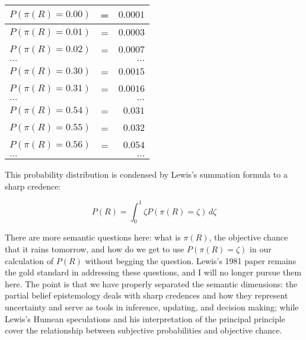\begin{tabular}{|lcr|} 
  \hline
  $P(\pi(R)=0.00)$ & = & $0.0001$ \\ \hline
  $P(\pi(R)=0.01)$ & = & $0.0003$ \\ \hline
  $P(\pi(R)=0.02)$ & = & $0.0007$ \\ \hline
  $\ldots$ & & $\ldots$ \\ \hline
  $P(\pi(R)=0.30)$ & = & $0.0015$ \\ \hline
  $P(\pi(R)=0.31)$ & = & $0.0016$ \\ \hline
  $\ldots$ & & $\ldots$ \\ \hline
  $P(\pi(R)=0.54)$ & = & $0.031$ \\ \hline
  $P(\pi(R)=0.55)$ & = & $0.032$ \\ \hline
  $P(\pi(R)=0.56)$ & = & $0.054$ \\ \hline
  $\ldots$ & & $\ldots$ \\ \hline
\end{tabular}

This probability distribution is condensed by Lewis's
summation formula to a sharp credence:

\begin{equation}
  \label{eq:s2}
  P(R)=\int_{0}^{1}\zeta{}P(\pi(R)=\zeta)\,d\zeta
\end{equation}

There are more semantic questions here: what is
$\pi(R)$, the objective chance that it rains tomorrow,
and how do we get to use $P(\pi(R)=\zeta)$ in our
calculation of $P(R)$ without begging the question.
Lewis's 1981 paper  remains the gold standard in
addressing these questions, and I will no longer pursue
them here. The point is that we have properly separated
the semantic dimensions: the partial belief
epistemology deals with sharp credences and how they
represent uncertainty and serve as tools in inference,
updating, and decision making; while Lewis's Humean
speculations and his interpretation of the principal
principle cover the relationship between subjective
probabilities and objective chance.

